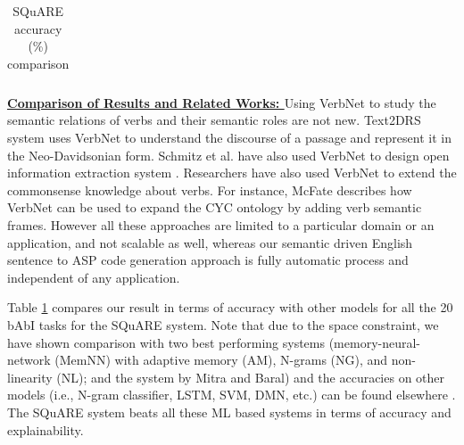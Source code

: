 \documentclass[letterpaper]{article}
\begin{document}
\begin{table}[b]
\begin{tabular}{|c||*{3}{c|}}
\end{tabular}

\caption{SQuARE accuracy (\%)  comparison}
\label{table:square_compare}
\end{table}



\noindent\textbf{\underline{Comparison of Results and Related Works: }}
Using VerbNet to study the semantic relations of verbs and their semantic roles are not new. Text2DRS system \cite{text_to_drs} uses VerbNet to understand the discourse of a passage and represent it in the Neo-Davidsonian form. Schmitz et al. have also used VerbNet to design open information extraction system \cite{vn_ie}. Researchers have also used VerbNet to extend the commonsense knowledge about verbs. For instance, McFate \cite{cyc_vn} describes how VerbNet can be used to expand the CYC ontology by adding verb semantic frames. However all these approaches are limited to a particular domain or an application, and not scalable as well, whereas our semantic driven English sentence to ASP code generation approach is fully automatic process and independent of any application.

Table \ref{table:square_compare} compares our result in terms of accuracy with other models for all the 20 bAbI tasks for the SQuARE system. Note that due to the space constraint, we have shown comparison with two best performing systems (memory-neural-network (MemNN) with adaptive memory (AM), N-grams (NG), and non-linearity (NL); and the system by Mitra and Baral) and the accuracies on other models (i.e., N-gram classifier, LSTM, SVM, DMN, etc.) can be found elsewhere \cite{babi,dmn}. The SQuARE system beats all these ML based systems in terms of accuracy and explainability.

\end{document}
